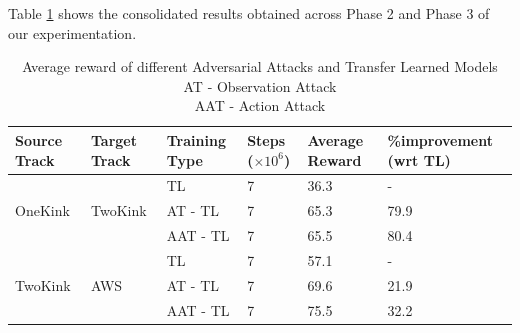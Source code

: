 Table \ref{tab:phase2} shows the consolidated results obtained across
Phase 2 and Phase 3 of our experimentation.
\begin{table}[H]
\begin{tabular}{|p{1.8cm}|p{1.8cm}|l|p{1.8cm}|l|p{3.2cm}|}
\hline
\textbf{Source Track} & \textbf{Target Track} & \textbf{Training Type} & \textbf{Steps ($\times 10^{6}$)} & \textbf{Average Reward} & \textbf{\%improvement (wrt TL)} \\ \hline
\multirow{3}{*}{OneKink}               & \multirow{3}{*}{TwoKink}               & TL                                      & 7                                             & 36.3                                     & -                      \\ \cline{3-6} 
                                      &                                        & AT - TL                                 & 7                                             & 65.3                                     & 79.9                   \\ \cline{3-6} 
                                      &                                        & AAT - TL                                & 7                                             & 65.5                                     & 80.4                   \\ \hline
\multirow{3}{*}{TwoKink}               & \multirow{3}{*}{AWS}                   & TL                                      & 7                                             & 57.1                                     & -                      \\ \cline{3-6} 
                                      &                                        & AT - TL                                 & 7                                             & 69.6                                     & 21.9                   \\ \cline{3-6} 
                                      &                                        & AAT - TL                                & 7                                             & 75.5                                     & 32.2                   \\ \hline
\end{tabular}
\caption{Average reward  of different Adversarial Attacks and Transfer Learned Models \\ AT - Observation Attack \\ AAT - Action Attack}
\label{tab:phase2}
\end{table}



